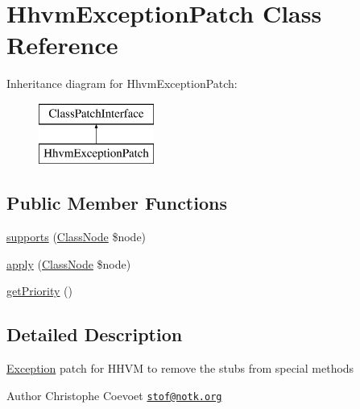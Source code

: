 \hypertarget{class_prophecy_1_1_doubler_1_1_class_patch_1_1_hhvm_exception_patch}{}\section{Hhvm\+Exception\+Patch Class Reference}
\label{class_prophecy_1_1_doubler_1_1_class_patch_1_1_hhvm_exception_patch}
Inheritance diagram for Hhvm\+Exception\+Patch\+:\begin{figure}[H]
\begin{center}
\leavevmode
\includegraphics[height=2.000000cm]{class_prophecy_1_1_doubler_1_1_class_patch_1_1_hhvm_exception_patch}
\end{center}
\end{figure}
\subsection*{Public Member Functions}
\begin{DoxyCompactItemize}
\item 
\mbox{\hyperlink{class_prophecy_1_1_doubler_1_1_class_patch_1_1_hhvm_exception_patch_a99b2455ac194faf79aff042c55719ac2}{supports}} (\mbox{\hyperlink{class_prophecy_1_1_doubler_1_1_generator_1_1_node_1_1_class_node}{Class\+Node}} \$node)
\item 
\mbox{\hyperlink{class_prophecy_1_1_doubler_1_1_class_patch_1_1_hhvm_exception_patch_a62fdb697928f35fc782d6889b8fe9b8b}{apply}} (\mbox{\hyperlink{class_prophecy_1_1_doubler_1_1_generator_1_1_node_1_1_class_node}{Class\+Node}} \$node)
\item 
\mbox{\hyperlink{class_prophecy_1_1_doubler_1_1_class_patch_1_1_hhvm_exception_patch_a1e7a3c168dcd0901a0d2669c67575b55}{get\+Priority}} ()
\end{DoxyCompactItemize}


\subsection{Detailed Description}
\mbox{\hyperlink{namespace_prophecy_1_1_exception}{Exception}} patch for H\+H\+VM to remove the stubs from special methods

\begin{DoxyAuthor}{Author}
Christophe Coevoet \href{mailto:stof@notk.org}{\tt stof@notk.\+org} 
\end{DoxyAuthor}



